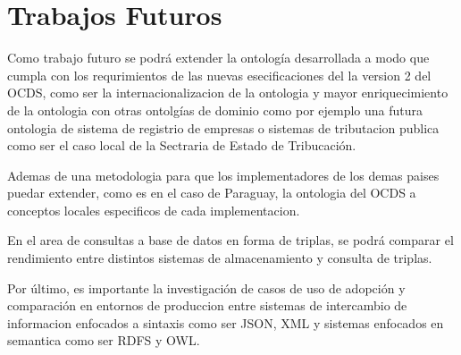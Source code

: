 \section{Trabajos Futuros}
\label{chap:futuros}

Como trabajo futuro se podrá extender la ontología desarrollada a modo que cumpla con los requrimientos de las nuevas esecificaciones del la version 2 del OCDS, como ser la internacionalizacion de la ontologia y mayor enriquecimiento de la ontologia con otras ontolgías de dominio como por ejemplo una futura ontologia de sistema de registrio de empresas o sistemas de tributacion publica como ser el caso local de la Sectraria de Estado de Tribucación. 

Ademas de una metodologia para que los implementadores de los demas paises puedar extender, como es en el caso de Paraguay, la ontologia del OCDS a conceptos locales especificos de cada implementacion.

En el area de consultas a base de datos en forma de triplas, se podrá comparar el rendimiento entre distintos sistemas de almacenamiento y consulta de triplas.

Por último, es importante la investigación de casos de uso de adopción y comparación en entornos de produccion entre sistemas de intercambio de informacion enfocados a sintaxis como ser JSON, XML y sistemas enfocados en semantica como ser RDFS y OWL. 

